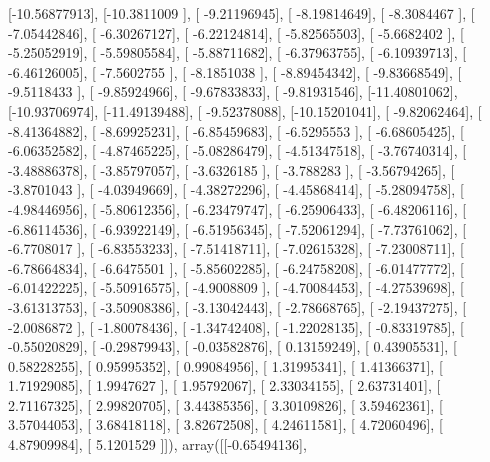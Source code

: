 \documentclass{article}
\begin{document}
       [-10.56877913],
       [-10.3811009 ],
       [ -9.21196945],
       [ -8.19814649],
       [ -8.3084467 ],
       [ -7.05442846],
       [ -6.30267127],
       [ -6.22124814],
       [ -5.82565503],
       [ -5.6682402 ],
       [ -5.25052919],
       [ -5.59805584],
       [ -5.88711682],
       [ -6.37963755],
       [ -6.10939713],
       [ -6.46126005],
       [ -7.5602755 ],
       [ -8.1851038 ],
       [ -8.89454342],
       [ -9.83668549],
       [ -9.5118433 ],
       [ -9.85924966],
       [ -9.67833833],
       [ -9.81931546],
       [-11.40801062],
       [-10.93706974],
       [-11.49139488],
       [ -9.52378088],
       [-10.15201041],
       [ -9.82062464],
       [ -8.41364882],
       [ -8.69925231],
       [ -6.85459683],
       [ -6.5295553 ],
       [ -6.68605425],
       [ -6.06352582],
       [ -4.87465225],
       [ -5.08286479],
       [ -4.51347518],
       [ -3.76740314],
       [ -3.48886378],
       [ -3.85797057],
       [ -3.6326185 ],
       [ -3.788283  ],
       [ -3.56794265],
       [ -3.8701043 ],
       [ -4.03949669],
       [ -4.38272296],
       [ -4.45868414],
       [ -5.28094758],
       [ -4.98446956],
       [ -5.80612356],
       [ -6.23479747],
       [ -6.25906433],
       [ -6.48206116],
       [ -6.86114536],
       [ -6.93922149],
       [ -6.51956345],
       [ -7.52061294],
       [ -7.73761062],
       [ -6.7708017 ],
       [ -6.83553233],
       [ -7.51418711],
       [ -7.02615328],
       [ -7.23008711],
       [ -6.78664834],
       [ -6.6475501 ],
       [ -5.85602285],
       [ -6.24758208],
       [ -6.01477772],
       [ -6.01422225],
       [ -5.50916575],
       [ -4.9008809 ],
       [ -4.70084453],
       [ -4.27539698],
       [ -3.61313753],
       [ -3.50908386],
       [ -3.13042443],
       [ -2.78668765],
       [ -2.19437275],
       [ -2.0086872 ],
       [ -1.80078436],
       [ -1.34742408],
       [ -1.22028135],
       [ -0.83319785],
       [ -0.55020829],
       [ -0.29879943],
       [ -0.03582876],
       [  0.13159249],
       [  0.43905531],
       [  0.58228255],
       [  0.95995352],
       [  0.99084956],
       [  1.31995341],
       [  1.41366371],
       [  1.71929085],
       [  1.9947627 ],
       [  1.95792067],
       [  2.33034155],
       [  2.63731401],
       [  2.71167325],
       [  2.99820705],
       [  3.44385356],
       [  3.30109826],
       [  3.59462361],
       [  3.57044053],
       [  3.68418118],
       [  3.82672508],
       [  4.24611581],
       [  4.72060496],
       [  4.87909984],
       [  5.1201529 ]]), array([[-0.65494136],
\end{document}
